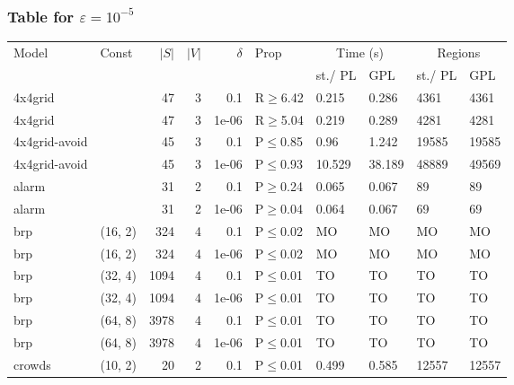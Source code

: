 \subsubsection{Table for \(\varepsilon=10^{-5}\)}
\begin{longtable}{llrrrlllll}

        \toprule
        Model & Const & $|S|$ & $|V|$ & $\delta$ & Prop & \multicolumn{2}{c}{Time (s)} & \multicolumn{2}{c}{Regions} \\
        \cmidrule(ll){7-8} \cmidrule(ll){9-10}
        & & & & & & st./ PL & GPL & st./ PL & GPL \\
        \midrule
        
 4x4grid       &           &     	47 &   3 & 0.1   & R$\geq$6.42  & 0.215   & 0.286   & 4361    & 4361    \\
 4x4grid       &           &     	47 &   3 & 1e-06 & R$\geq$5.04  & 0.219   & 0.289   & 4281    & 4281    \\
 4x4grid-avoid &           &     	45 &   3 & 0.1   & P$\leq$0.85  & 0.96    & 1.242   & 19585   & 19585   \\
 4x4grid-avoid &           &     	45 &   3 & 1e-06 & P$\leq$0.93  & 10.529  & 38.189  & 48889   & 49569   \\
 alarm         &           &     	31 &   2 & 0.1   & P$\geq$0.24  & 0.065   & 0.067   & 89      & 89      \\
 alarm         &           &     	31 &   2 & 1e-06 & P$\geq$0.04  & 0.064   & 0.067   & 69      & 69      \\
 brp           & (16, 2)   &    	324 &   4 & 0.1   & P$\leq$0.02  & MO      & MO      & MO      & MO      \\
 brp           & (16, 2)   &    	324 &   4 & 1e-06 & P$\leq$0.02  & MO      & MO      & MO      & MO      \\
 brp           & (32, 4)   &   	1094 &   4 & 0.1   & P$\leq$0.01  & TO      & TO      & TO      & TO      \\
 brp           & (32, 4)   &   	1094 &   4 & 1e-06 & P$\leq$0.01  & TO      & TO      & TO      & TO      \\
 brp           & (64, 8)   &   	3978 &   4 & 0.1   & P$\leq$0.01  & TO      & TO      & TO      & TO      \\
 brp           & (64, 8)   &   	3978 &   4 & 1e-06 & P$\leq$0.01  & TO      & TO      & TO      & TO      \\
 crowds        & (10, 2)   &     	20 &   2 & 0.1   & P$\leq$0.01  & 0.499   & 0.585   & 12557   & 12557   \\

\end{longtable}
